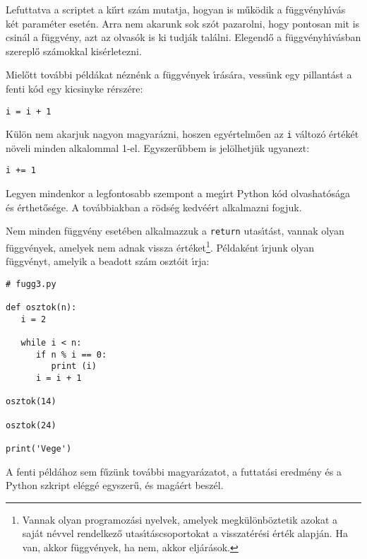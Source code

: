 \documentclass[12pt]{article}
\begin{document}
Lefuttatva a scriptet a ki\'{\i}rt sz\'am mutatja, hogyan is m\H{u}k\"odik a f\"uggv\'enyh\'{\i}v\'as k\'et param\'eter 
eset\'en. Arra nem akarunk sok sz\'ot pazarolni, hogy pontosan mit is csin\'al a f\"uggv\'eny, azt az olvas\'ok is ki 
tudj\'ak tal\'alni. Elegend\H{o} a f\"uggv\'enyh\'{\i}v\'asban szerepl\H{o} sz\'amokkal kis\'erletezni. 

Miel\H{o}tt tov\'abbi p\'eld\'akat n\'ezn\'enk a f\"uggv\'enyek \'{\i}r\'as\'ara, vess\"unk egy pillant\'ast a fenti k\'od 
egy kicsinyke r\'ersz\'ere:

\begin{Verbatim}[fontsize=\small]
   i = i + 1
\end{Verbatim}

\noindent K\"ul\"on nem akarjuk nagyon magyar\'azni, hoszen egy\'ertelm\H{o}en az {\tt i} v\'altoz\'o \'ert\'ek\'et 
n\"oveli minden alkalommal 1-el. Egyszer\H{u}bbem is jel\"olhetj\"uk ugyanezt:

\begin{Verbatim}[fontsize=\small]
   i += 1
\end{Verbatim}

\noindent Legyen mindenkor a legfontosabb szempont a meg\'{\i}rt Python k\'od olvashat\'os\'aga \'es 
\'erthet\H{o}s\'ege. A tov\'abbiakban a r\"ods\'eg kedv\'e\'ert alkalmazni fogjuk. 

Nem minden f\"uggv\'eny eset\'eben alkalmazzuk a {\tt return} utas\'{\i}t\'ast, vannak olyan f\"uggv\'enyek, amelyek nem 
adnak vissza \'ert\'eket\footnote{Vannak olyan programoz\'asi nyelvek, amelyek megk\"ul\"onb\"oztetik azokat a saj\'at 
n\'evvel rendelkez\H{o} utas\'{\i}t\'ascsoportokat a visszat\'er\'esi \'ert\'ek alapj\'an. Ha van, akkor f\"uggv\'enyek, 
ha nem, akkor elj\'ar\'asok.}. P\'eldak\'ent \'{\i}rjunk olyan f\"uggv\'enyt, amelyik a beadott sz\'am oszt\'oit \'{\i}rja:

\begin{Verbatim}[fontsize=\small]
# fugg3.py

def osztok(n):
   i = 2

   while i < n:
      if n % i == 0:
         print (i)
      i = i + 1

osztok(14)

osztok(24)

print('Vege')  
\end{Verbatim}

A fenti p\'eld\'ahoz sem f\H{u}z\"unk tov\'abbi magyar\'azatot, a futtat\'asi eredm\'eny \'es a Python szkript el\'egg\'e 
egyszer\H{u}, \'es mag\'a\'ert besz\'el.
\end{document}
